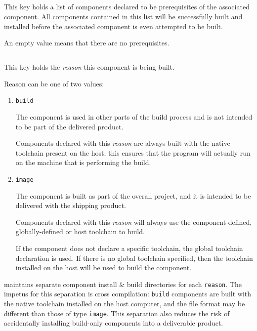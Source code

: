 \subsection{}\label{variables:prerequisite}

This key holds a list of components declared to be prerequisites of
the associated component.  All components contained in this list will
be successfully built and installed before the associated component is
even attempted to be built.

An empty value means that there are no prerequisites.


\subsection{}\label{variables:reason}

This key holds the \emph{reason} this component is being built.

Reason can be one of two values:

  \begin{enumerate}
  \item \texttt{build}

    The component is used in other parts of the build process and is
    not intended to be part of the delivered product.

    Components declared with this \emph{reason} are always built with
    the native toolchain present on the host; this ensures that the
    program will actually run on the machine that is performing the
    build.

  \item \texttt{image}

    The component is built as part of the overall project, and it is
    intended to be delivered with the shipping product.

    Components declared with this \emph{reason} will always use the
    component-defined, globally-defined or host toolchain to build.

    If the component does not declare a specific toolchain, the global
    toolchain declaration is used.  If there is no global toolchain
    specified, then the toolchain installed on the host will be used
    to build the component.

  \end{enumerate}

  \lmsbw maintains separate component install \& build directories for
  each \texttt{reason}.  The impetus for this separation is cross
  compilation: \texttt{build} components are built with the native
  toolchain installed on the host computer, and the file format may be
  different than those of type \texttt{image}.  This separation also
  reduces the risk of accidentally installing build-only components
  into a deliverable product.

